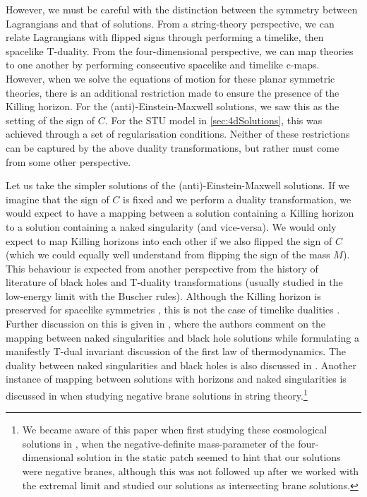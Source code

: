 However, we must be careful with the distinction between the symmetry between Lagrangians and that of solutions. From a string-theory perspective, we can relate Lagrangians with flipped signs through performing a timelike, then spacelike T-duality. From the four-dimensional perspective, we can map theories to one another by performing consecutive spacelike and timelike c-maps. However, when we solve the equations of motion for these planar symmetric theories, there is an additional restriction made to ensure the presence of the Killing horizon. For the (anti)-Einstein-Maxwell solutions, we saw this as the setting of the sign of $C$. For the STU model in \ref{sec:4dSolutions}, this was achieved through a set of regularisation conditions. Neither of these restrictions can be captured by the above duality transformations, but rather must come from some other perspective.

Let us take the simpler solutions of the (anti)-Einstein-Maxwell solutions. If we imagine that the sign of $C$ is fixed and we perform a duality transformation, we would expect to have a mapping between a solution containing a Killing horizon to a solution containing a naked singularity (and vice-versa). We would only expect to map Killing horizons into each other if we also flipped the sign of $C$ (which we could equally well understand from flipping the sign of the mass $M$). This behaviour is expected from another perspective from the history of literature of black holes and T-duality transformations (usually studied in the low-energy limit with the Buscher rules). Although the Killing horizon is preserved for spacelike symmetries \cite{Horowitz:1993wt}, this is not the case of timelike dualities \cite{Rocek:1991ps}. Further discussion on this is given in \cite{Arvanitakis:2016zes}, where the authors comment on the mapping between naked singularities and black hole solutions while formulating a manifestly T-dual invariant discussion of the first law of thermodynamics. The duality between naked singularities and black holes is also discussed in \cite{Rinaldi:2002tc, Manko:2018yrc}. Another instance of mapping between solutions with horizons and naked singularities is discussed in \cite{Dijkgraaf:2016lym} when studying negative brane solutions in string theory.\footnote{We became aware of this paper when first studying these cosmological solutions in \cite{Gutowski:2019iyo}, when the negative-definite mass-parameter of the four-dimensional solution in the static patch seemed to hint that our solutions were negative branes, although this was not followed up after we worked with the extremal limit and studied our solutions as intersecting brane solutions.}


